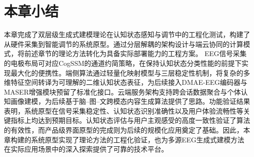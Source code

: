 \section{本章小结}
本章完成了双层级生成式建模理论在认知状态感知与调节中的工程化测试，构建了从硬件采集到智能调节的系统原型。通过分层解耦的架构设计与端云协同的计算模式，将前述章节的理论方法转化为具备实际部署能力的工程方案。
EEG信号采集的电极布局可对应CogSSM的通道约简策略，在保持认知状态分类性能的前提下实现最大化的便携性。端侧算法通过轻量化映射模型与三层稳定性机制，将复杂的多维特征空间转译为可理解的二维认知状态表征，为后续接入DMAE-EEG编码器与MASER增强模块预留了标准化接口。云端服务架构支持跨会话数据聚合与个体认知画像建模，为后续基于脑--图--文跨模态内容生成算法提供了思路。功能验证结果表明，系统原型在信号采集稳定性、认知状态识别准确性以及用户体验流畅性等关键指标上均达到预期目标。认知状态评估与用户主观感受的高度一致性验证了算法的有效性，而产品级界面原型的完成则为后续的规模化应用奠定了基础。因此，本章构建的系统原型实现了理论方法的工程化验证，也为多源EEG生成式建模方法在实际应用场景中的深入探索提供了可靠的技术平台。
